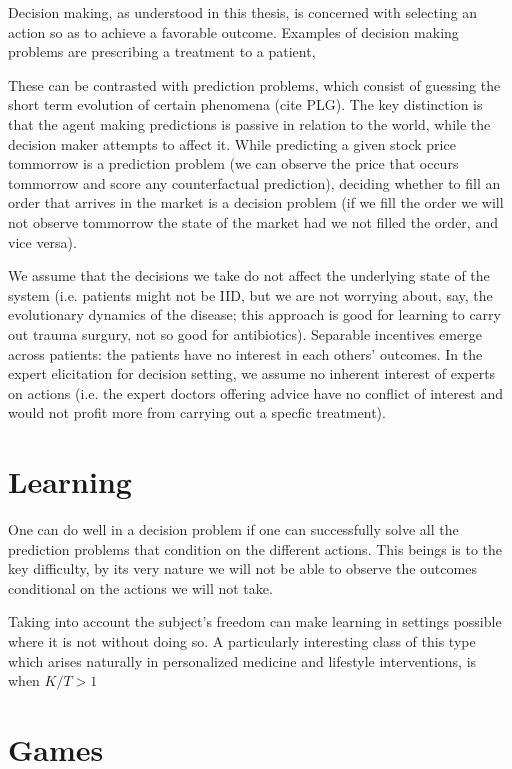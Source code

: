 Decision making, as understood in this thesis, is concerned with selecting an action so as to achieve a favorable outcome. 
Examples of decision making problems are prescribing a treatment to a patient, 

These can be contrasted with prediction problems, which consist of guessing the short term evolution of certain phenomena (cite PLG).
The key distinction is that the agent making predictions is passive in relation to the world, while the decision maker attempts to affect it.
While predicting a given stock price tommorrow is a prediction problem (we can observe the price that occurs tommorrow and score any counterfactual prediction), deciding whether to fill an order that arrives in the market is a decision problem (if we fill the order we will not observe tommorrow the state of the market had we not filled the order, and vice versa).


We assume that the decisions we take do not affect the underlying state of the system (i.e. patients might not be IID, but we are not worrying about, say, the evolutionary dynamics of the disease; this approach is good for learning to carry out trauma surgury, not so good for antibiotics).  Separable incentives emerge across patients: the patients have no interest in each others' outcomes. 
In the expert elicitation for decision setting, we assume no inherent interest of experts on actions (i.e. the expert doctors offering advice have no conflict of interest and would not profit more from carrying out a specfic treatment).


\section{Learning}


One can do well in a decision problem if one can successfully solve all the prediction problems that condition on the different actions.
This beings is to the key difficulty, by its very nature we will not be able to observe the outcomes conditional on the actions we will not take. 

Taking into account the subject's freedom can make learning in settings possible where it is not without doing so.
A particularly interesting class of this type which arises naturally in personalized medicine and lifestyle interventions, is when $K/T > 1$


\section{Games}

